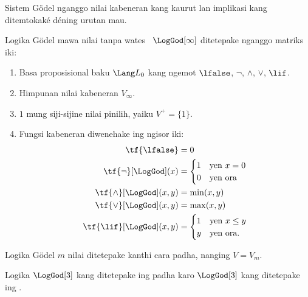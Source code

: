 \documentclass[../../../include/open-logic-section]{subfiles}
\begin{document}


\begin{editorial}
Sistem G\"odel nganggo nilai kabeneran kang kaurut lan implikasi kang ditemtokaké déning urutan mau.
\end{editorial}

\begin{defn} Logika G\"odel mawa nilai tanpa wates
~$\LogGod[\infty]$ ditetepake nganggo matriks iki:
\begin{enumerate}
  \item Basa proposisional baku $\Lang L_0$ kang ngemot
  $\lfalse$, $\lnot$, $\land$, $\lor$, $\lif$.
  \item Himpunan nilai kabeneran $V_\infty$.
  \item $1$ mung siji-sijine nilai pinilih, yaiku $V^+ = \{1\}$.
  \item Fungsi kabeneran diwenehake ing ngisor iki:
  \begin{align*}
    \tf{\lfalse} & = 0\\
    \tf{\lnot}[\LogGod](x) & = \begin{cases}
      1 & \text{yen } x =0\\
      0 & \text{yen ora}
    \end{cases}\\
    \tf{\land}[\LogGod](x,y) & = \min(x,y)\\
    \tf{\lor}[\LogGod](x,y) & = \max(x,y)\\
    \tf{\lif}[\LogGod](x,y) & = \begin{cases}
      1 & \text{yen } x \le y\\
      y & \text{yen ora.}
    \end{cases}
    \end{align*}
\end{enumerate}
Logika G\"odel $m$ nilai ditetepake kanthi cara padha, nanging $V = V_m$.
\end{defn}

\begin{prop}
  Logika $\LogGod[3]$ kang ditetepake ing
   padha karo $\LogGod[3]$
  kang ditetepake ing .
\end{prop}
\end{document}
